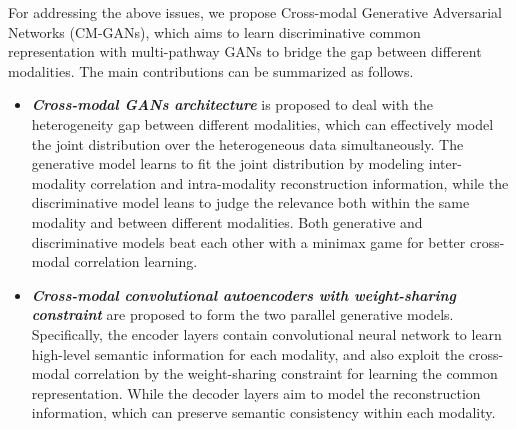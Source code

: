 \documentclass[journal]{IEEEtran}
\begin{document}
For addressing the above issues, we propose Cross-modal Generative Adversarial Networks (CM-GANs), which aims to learn discriminative common representation with multi-pathway GANs to bridge the gap between different modalities. The main contributions can be summarized as follows.
\begin{itemize}
	\item{
		\textbf{\textit{Cross-modal GANs architecture}} is proposed to deal with the heterogeneity gap between different modalities, which can effectively model the joint distribution over the heterogeneous data simultaneously. The generative model learns to fit the joint distribution by modeling inter-modality correlation and intra-modality reconstruction information, while the discriminative model leans to judge the relevance both within the same modality and between different modalities. Both generative and discriminative models beat each other with a minimax game for better cross-modal correlation learning.
	} 
	\item{
		\textbf{\textit{Cross-modal convolutional autoencoders with weight-sharing constraint}} are proposed to form the two parallel generative models. Specifically, the encoder layers contain convolutional neural network to learn high-level semantic information for each modality, and also exploit the cross-modal correlation by the weight-sharing constraint for learning the common representation. While the decoder layers aim to model the reconstruction information, which can preserve semantic consistency within each modality.
}
\end{itemize}
\end{document}
